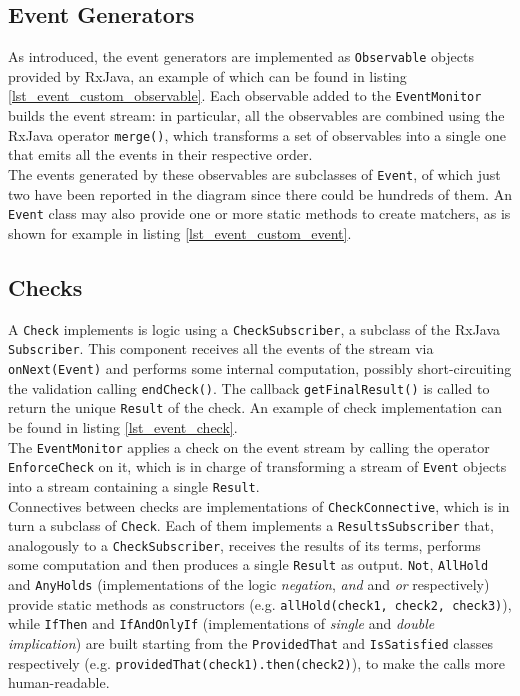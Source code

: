 \documentclass[11pt,a4paper,notitlepage]{article}
\begin{document}
\subsection{Event Generators}
As introduced, the event generators are implemented as \texttt{Observable} objects provided by RxJava, an example of which can be found in listing \ref{lst_event_custom_observable}. Each observable added to the \texttt{EventMonitor} builds the event stream: in particular, all the observables are combined using the RxJava operator \texttt{merge()}, which transforms a set of observables into a single one that emits all the events in their respective order.\medskip \\
The events generated by these observables are subclasses of \texttt{Event}, of which just two have been reported in the diagram since there could be hundreds of them. An \texttt{Event} class may also provide one or more static methods to create matchers, as is shown for example in listing \ref{lst_event_custom_event}.

\subsection{Checks}
A \texttt{Check} implements is logic using a \texttt{CheckSubscriber}, a subclass of the RxJava \texttt{Subscriber}. This component receives all the events of the stream via \texttt{onNext(Event)} and performs some internal computation, possibly short-circuiting the validation calling \texttt{endCheck()}. The callback \texttt{getFinalResult()} is called to return the unique \texttt{Result} of the check. An example of check implementation can be found in listing \ref{lst_event_check}.\medskip \\
The \texttt{EventMonitor} applies a check on the event stream by calling the operator \texttt{EnforceCheck} on it, which is in charge of transforming a stream of \texttt{Event} objects into a stream containing a single \texttt{Result}.\medskip \\
Connectives between checks are implementations of \texttt{CheckConnective}, which is in turn a subclass of \texttt{Check}. Each of them implements a \texttt{ResultsSubscriber} that, analogously to a \texttt{CheckSubscriber}, receives the results of its terms, performs some computation and then produces a single \texttt{Result} as output. \texttt{Not}, \texttt{AllHold} and \texttt{AnyHolds} (implementations of the logic \textit{negation}, \textit{and} and \textit{or} respectively) provide static methods as constructors (e.g. \texttt{allHold(check1, check2, check3)}), while \texttt{IfThen} and \texttt{IfAndOnlyIf} (implementations of \textit{single} and \textit{double implication}) are built starting from the \texttt{ProvidedThat} and \texttt{IsSatisfied} classes respectively (e.g. \texttt{providedThat(check1).then(check2)}), to make the calls more human-readable.
\end{document}
